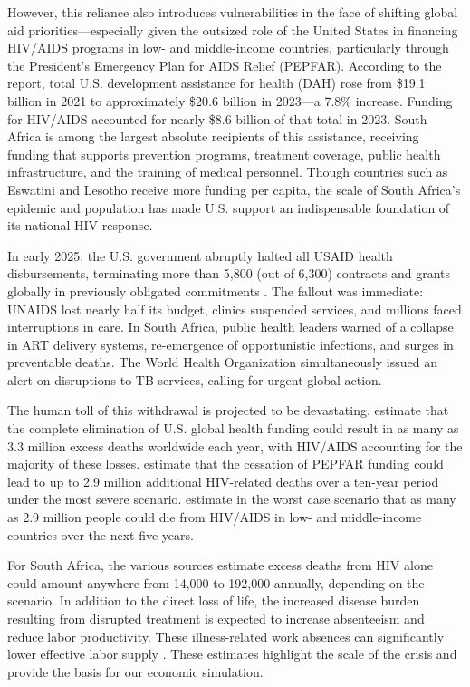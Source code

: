 \documentclass[letterpaper,12pt]{article}
\theoremstyle{definition}
\begin{document}
\begin{spacing}{1.5}
However, this reliance also introduces vulnerabilities in the face of shifting global aid priorities—especially given the outsized role of the United States in financing HIV/AIDS programs in low- and middle-income countries, particularly through the President’s Emergency Plan for AIDS Relief (PEPFAR). According to the \citet{FGH2023} report, total U.S. development assistance for health (DAH) rose from \$19.1 billion in 2021 to approximately \$20.6 billion in 2023—a 7.8\% increase. Funding for HIV/AIDS accounted for nearly \$8.6 billion of that total in 2023. South Africa is among the largest absolute recipients of this assistance, receiving funding that supports prevention programs, treatment coverage, public health infrastructure, and the training of medical personnel. Though countries such as Eswatini and Lesotho receive more funding per capita, the scale of South Africa’s epidemic and population has made U.S. support an indispensable foundation of its national HIV response.

In early 2025, the U.S. government abruptly halted all USAID health disbursements, terminating more than 5,800 (out of 6,300) contracts and grants globally in previously obligated commitments \citep{Cohen2025}. The fallout was immediate: UNAIDS lost nearly half its budget, clinics suspended services, and millions faced interruptions in care. In South Africa, public health leaders warned of a collapse in ART delivery systems, re-emergence of opportunistic infections, and surges in preventable deaths. The World Health Organization simultaneously issued an alert on disruptions to TB services, calling for urgent global action.

The human toll of this withdrawal is projected to be devastating. \citet{KS2025} estimate that the complete elimination of U.S. global health funding could result in as many as 3.3 million excess deaths worldwide each year, with HIV/AIDS accounting for the majority of these losses. \citet{Gandhi2025} estimate that the cessation of PEPFAR funding could lead to up to 2.9 million additional HIV-related deaths over a ten-year period under the most severe scenario.  estimate in the worst case scenario that as many as 2.9 million people could die from HIV/AIDS in low- and middle-income countries over the next five years. 

For South Africa, the various sources estimate excess deaths from HIV alone could amount anywhere from 14,000 to 192,000 annually, depending on the scenario. In addition to the direct loss of life, the increased disease burden resulting from disrupted treatment is expected to increase absenteeism and reduce labor productivity. These illness-related work absences can significantly lower effective labor supply \citep{Keogh2024,Panda2024}. These estimates highlight the scale of the crisis and provide the basis for our economic simulation.


\end{spacing}
\end{document}
